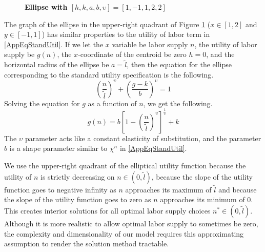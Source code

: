 \documentclass[letterpaper,12pt]{article}
\theoremstyle{definition}
\begin{document}
  \begin{figure}[htb]\centering \captionsetup{width=3.0in}
    \caption{\label{FigEllipseGen}\textbf{Ellipse with $[h,k,a,b,\upsilon]=[1,-1,1,2,2]$}}
  \end{figure}

  The graph of the ellipse in the upper-right quadrant of Figure \ref{FigEllipseGen} ($x\in[1,2]$ and $y\in[-1,1]$) has similar properties to the utility of labor term in \eqref{AppEqStandUtil}. If we let the $x$ variable be labor supply $n$, the utility of labor supply be $g(n)$, the $x$-coordinate of the centroid be zero $h=0$, and the horizontal radius of the ellipse be $a=\tilde{l}$, then the equation for the ellipse corresponding to the standard utility specification is the following.
  \begin{equation}\label{AppEqEllipseN}
    \left(\frac{n}{\tilde{l}}\right)^\upsilon + \left(\frac{g - k}{b}\right)^\upsilon = 1
  \end{equation}
  Solving the equation for $g$ as a function of $n$, we get the following.
  \begin{equation}\label{AppEqGn}
    g(n) = b\left[1 - \left(\frac{n}{\tilde{l}}\right)^\upsilon\right]^{\frac{1}{\upsilon}} + k
  \end{equation}
  The $\upsilon$ parameter acts like a constant elasticity of substitution, and the parameter $b$ is a shape parameter similar to $\chi^n$ in \eqref{AppEqStandUtil}.

  We use the upper-right quadrant of the elliptical utility function because the utility of $n$ is strictly decreasing on $n\in(0,\tilde{l})$, because the slope of the utility function goes to negative infinity as $n$ approaches its maximum of $\tilde{l}$ and because the slope of the utility function goes to zero as $n$ approaches its minimum of 0. This creates interior solutions for all optimal labor supply choices $n^*\in(0,\tilde{l})$. Although it is more realistic to allow optimal labor supply to sometimes be zero, the complexity and dimensionality of our model requires this approximating assumption to render the solution method tractable.
\end{document}
